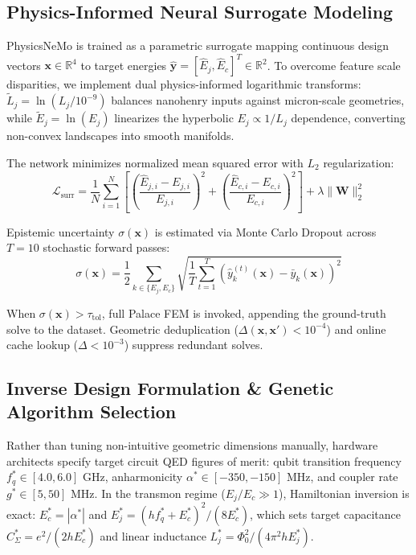 \documentclass[journal,10pt,twocolumn]{IEEEtran}
\begin{document}
\subsection{Physics-Informed Neural Surrogate Modeling}
PhysicsNeMo is trained as a parametric surrogate mapping continuous design vectors $\mathbf{x} \in \mathbb{R}^4$ to target energies $\hat{\mathbf{y}} = [\hat{E}_j, \hat{E}_c]^T \in \mathbb{R}^2$. To overcome feature scale disparities, we implement dual physics-informed logarithmic transforms: $\tilde{L}_j = \ln(L_j / 10^{-9})$ balances nanohenry inputs against micron-scale geometries, while $\tilde{E}_j = \ln(E_j)$ linearizes the hyperbolic $E_j \propto 1/L_j$ dependence, converting non-convex landscapes into smooth manifolds.

The network minimizes normalized mean squared error with $L_2$ regularization:
\begin{equation}
\mathcal{L}_{\text{surr}} = \frac{1}{N}\sum_{i=1}^N \left[ \left(\frac{\hat{E}_{j,i} - E_{j,i}}{E_{j,i}}\right)^2 + \left(\frac{\hat{E}_{c,i} - E_{c,i}}{E_{c,i}}\right)^2 \right] + \lambda \|\mathbf{W}\|_2^2
\label{eq:loss}
\end{equation}

Epistemic uncertainty $\sigma(\mathbf{x})$ is estimated via Monte Carlo Dropout across $T = 10$ stochastic forward passes:
\begin{equation}
\sigma(\mathbf{x}) = \frac{1}{2} \sum_{k \in \{E_j, E_c\}} \sqrt{\frac{1}{T}\sum_{t=1}^T \left(\hat{y}_k^{(t)}(\mathbf{x}) - \bar{y}_k(\mathbf{x})\right)^2}
\label{eq:uncertainty}
\end{equation}

When $\sigma(\mathbf{x}) > \tau_{\text{tol}}$, full Palace FEM is invoked, appending the ground-truth solve to the dataset. Geometric deduplication ($\Delta(\mathbf{x},\mathbf{x}') < 10^{-4}$) and online cache lookup ($\Delta < 10^{-3}$) suppress redundant solves.

\subsection{Inverse Design Formulation \& Genetic Algorithm Selection}
Rather than tuning non-intuitive geometric dimensions manually, hardware architects specify target circuit QED figures of merit: qubit transition frequency $f_q^* \in [4.0, 6.0]\text{ GHz}$, anharmonicity $\alpha^* \in [-350, -150]\text{ MHz}$, and coupler rate $g^* \in [5, 50]\text{ MHz}$. In the transmon regime ($E_j / E_c \gg 1$), Hamiltonian inversion is exact: $E_c^* = |\alpha^*|$ and $E_j^* = (h f_q^* + E_c^*)^2 / (8 E_c^*)$, which sets target capacitance $C_\Sigma^* = e^2 / (2 h E_c^*)$ and linear inductance $L_j^* = \Phi_0^2 / (4\pi^2 h E_j^*)$.
\end{document}
